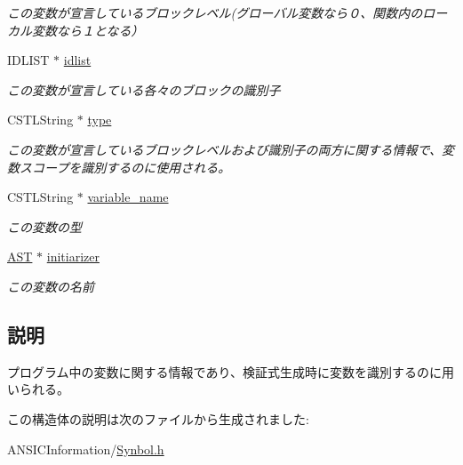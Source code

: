 \begin{DoxyCompactItemize}
\begin{DoxyCompactList}\small\item\em この変数が宣言しているブロックレベル(グローバル変数なら０、関数内のローカル変数なら１となる） \item\end{DoxyCompactList}\item 
\hypertarget{structvariable__table_ab7fbad4dd717512360b7f947a277b10b}{
IDLIST $\ast$ \hyperlink{structvariable__table_ab7fbad4dd717512360b7f947a277b10b}{idlist}}
\label{structvariable__table_ab7fbad4dd717512360b7f947a277b10b}

\begin{DoxyCompactList}\small\item\em この変数が宣言している各々のブロックの識別子 \item\end{DoxyCompactList}\item 
\hypertarget{structvariable__table_a3fbbc0d31aed9894be0bddaf8cb4af49}{
CSTLString $\ast$ \hyperlink{structvariable__table_a3fbbc0d31aed9894be0bddaf8cb4af49}{type}}
\label{structvariable__table_a3fbbc0d31aed9894be0bddaf8cb4af49}

\begin{DoxyCompactList}\small\item\em この変数が宣言しているブロックレベルおよび識別子の両方に関する情報で、変数スコープを識別するのに使用される。 \item\end{DoxyCompactList}\item 
\hypertarget{structvariable__table_a5f81ceac01a5b8c2632ddd2e1588436b}{
CSTLString $\ast$ \hyperlink{structvariable__table_a5f81ceac01a5b8c2632ddd2e1588436b}{variable\_\-name}}
\label{structvariable__table_a5f81ceac01a5b8c2632ddd2e1588436b}

\begin{DoxyCompactList}\small\item\em この変数の型 \item\end{DoxyCompactList}\item 
\hypertarget{structvariable__table_ad1094019a19afcd1acf8b9242e501bf5}{
\hyperlink{structabstract__syntax__tree}{AST} $\ast$ \hyperlink{structvariable__table_ad1094019a19afcd1acf8b9242e501bf5}{initiarizer}}
\label{structvariable__table_ad1094019a19afcd1acf8b9242e501bf5}

\begin{DoxyCompactList}\small\item\em この変数の名前 \item\end{DoxyCompactList}\end{DoxyCompactItemize}


\subsection{説明}
プログラム中の変数に関する情報であり、検証式生成時に変数を識別するのに用いられる。 

この構造体の説明は次のファイルから生成されました:\begin{DoxyCompactItemize}
\item 
ANSICInformation/\hyperlink{Synbol_8h}{Synbol.h}\end{DoxyCompactItemize}
